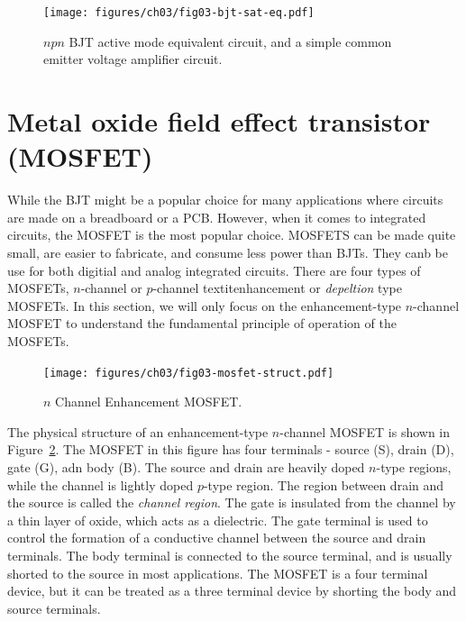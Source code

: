 \begin{figure}[b]
    \centering
    \texttt{[image: figures/ch03/fig03-bjt-sat-eq.pdf]}
    \caption{$npn$ BJT active mode equivalent circuit, and a simple common emitter voltage amplifier circuit.}
    \label{fig:03-bjt-sat-eqt}
\end{figure}

\section{Metal oxide field effect transistor (MOSFET)}
While the BJT might be a popular choice for many applications where circuits are made on a breadboard or a PCB. However, when it comes to integrated circuits, the MOSFET is the most popular choice. MOSFETS can be made quite small, are easier to fabricate, and consume less power than BJTs. They canb be use for both digitial and analog integrated circuits. There are four types of MOSFETs, $n$-channel or $p$-channel textit{enhancement} or \textit{depeltion} type MOSFETs. In this section, we will only focus on the enhancement-type $n$-channel MOSFET to understand the fundamental principle of operation of the MOSFETs.

\begin{figure}[t]
    \centering
    \texttt{[image: figures/ch03/fig03-mosfet-struct.pdf]}
    \caption{$n$ Channel Enhancement MOSFET.}
    \label{fig:03-mosfet-struct}
\end{figure}

The physical structure of an enhancement-type $n$-channel MOSFET is shown in Figure~\ref{fig:03-mosfet-struct}. The MOSFET in this figure has four terminals - source (S), drain (D), gate (G), adn body (B). The source and drain are heavily doped $n$-type regions, while the channel is lightly doped $p$-type region. The region between drain and the source is called the \textit{channel region}. The gate is insulated from the channel by a thin layer of oxide, which acts as a dielectric. The gate terminal is used to control the formation of a conductive channel between the source and drain terminals. The body terminal is connected to the source terminal, and is usually shorted to the source in most applications. The MOSFET is a four terminal device, but it can be treated as a three terminal device by shorting the body and source terminals.

